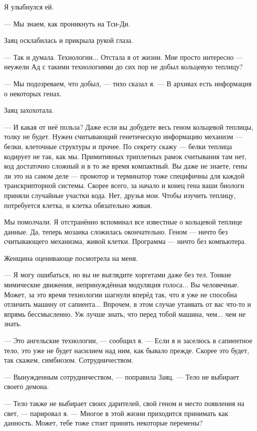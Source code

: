 Я улыбнулся ей.

--- Мы знаем, как проникнуть на Тси-Ди.

Заяц осклабилась и прикрыла рукой глаза.

--- Так и думала.
Технологии...
Отстала я от жизни.
Мне просто интересно --- неужели Ад с такими технологиями до сих пор не добыл кольцевую теплицу?

--- Мы подозреваем, что добыл, --- тихо сказал я.
--- В архивах есть информация о некоторых генах.

Заяц захохотала.

--- И какая от неё польза?
Даже если вы добудете весь геном кольцевой теплицы, толку не будет.
Нужен считывающий генетическую информацию механизм --- белки, клеточные структуры и прочее.
По секрету скажу --- белки теплица кодирует не так, как мы.
Примитивных триплетных рамок считывания там нет, код достаточно сложный и в то же время компактный.
Вы даже не знаете, гены ли это на самом деле --- промотор и терминатор тоже специфичны для каждой транскрипторной системы.
Скорее всего, за начало и конец гена ваши биологи приняли случайные участки кода.
Нет, друзья мои.
Чтобы изучить теплицу, потребуется клетка, и клетка обязательно живая.

Мы помолчали.
Я отстранённо вспоминал все известные о кольцевой теплице данные.
Да, теперь мозаика сложилась окончательно.
Геном --- ничто без считывающего механизма, живой клетки.
Программа --- ничто без компьютера.

Женщина оценивающе посмотрела на меня.

--- Я могу ошибаться, но вы не выглядите хоргетами даже без тел.
Тонкие мимические движения, непринуждённая модуляция голоса...
Вы человечные.
Может, за это время технологии шагнули вперёд так, что я уже не способна отличить машину от сапиента...
Впрочем, в этом случае утаивать от вас что-то и впрямь бессмысленно.
Уж лучше знать, что перед тобой машина, чем... чем не знать.

--- Это ангельские технологии, --- сообщил я.
--- Если я и заселюсь в сапиентное тело, это уже не будет насилием над ним, как бывало прежде.
Скорее это будет, так скажем, симбиозом.
Сотрудничеством.

--- Вынужденным сотрудничеством, --- поправила Заяц.
--- Тело не выбирает своего демона.

--- Тело также не выбирает своих дарителей, свой геном и место появления на свет, --- парировал я.
--- Многое в этой жизни приходится принимать как данность.
Может, тебе тоже стоит принять некоторые перемены?

